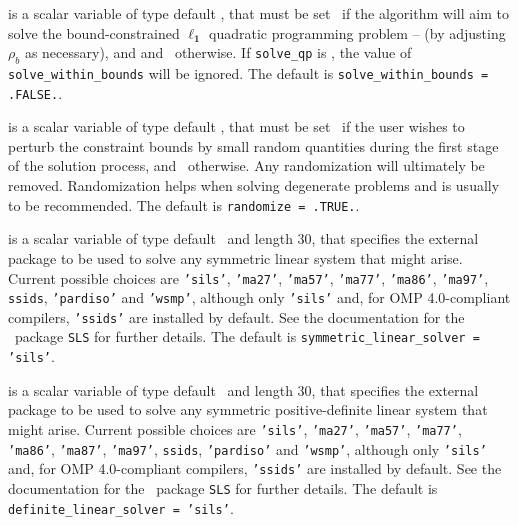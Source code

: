 \begin{description}
{ is a scalar variable of type default \logical, that
must be set \true\ if the algorithm will aim to solve
the bound-constrained $\mathbf{\ell_1}$ quadratic programming problem
-- (by adjusting $\rho_b$ as necessary), and
and \false\ otherwise.
If {\tt solve\_qp} is \true, the value of {\tt solve\_within\_bounds}
will be ignored. The default is {\tt solve\_within\_bounds = .FALSE.}.
}{}

 is a scalar variable of type default \logical, that
must be set \true\ if the user wishes to perturb the constraint bounds
by small random quantities during the first stage of the solution process,
and \false\ otherwise.
Any randomization will ultimately be removed. Randomization
helps when solving degenerate problems and is usually to be recommended.
The default is {\tt randomize = .TRUE.}.


 is a scalar variable of type default \character\
and length 30, that specifies the external package to be used to
solve any symmetric linear system that might arise. Current possible
choices are {\tt 'sils'}, {\tt 'ma27'}, {\tt 'ma57'}, {\tt 'ma77'},
{\tt 'ma86'}, {\tt 'ma97'}, {\tt ssids}, {\tt 'pardiso'}
and {\tt 'wsmp'},
although only {\tt 'sils'} and, for OMP 4.0-compliant compilers,
{\tt 'ssids'} are installed by default.
See the documentation for the \galahad\ package {\tt SLS} for further details.
The default is {\tt symmetric\_linear\_solver = 'sils'}.

 is a scalar variable of type default \character\
and length 30, that specifies the external package to be used to
solve any symmetric positive-definite linear system that might arise.
Current possible
choices are {\tt 'sils'}, {\tt 'ma27'}, {\tt 'ma57'}, {\tt 'ma77'},
{\tt 'ma86'}, {\tt 'ma87'}, {\tt 'ma97'}, {\tt ssids}, {\tt 'pardiso'}
and {\tt 'wsmp'},
although only {\tt 'sils'} and, for OMP 4.0-compliant compilers,
{\tt 'ssids'} are installed by default.
See the documentation for the \galahad\ package {\tt SLS} for further details.
The default is {\tt definite\_linear\_solver = 'sils'}.


\end{description}
